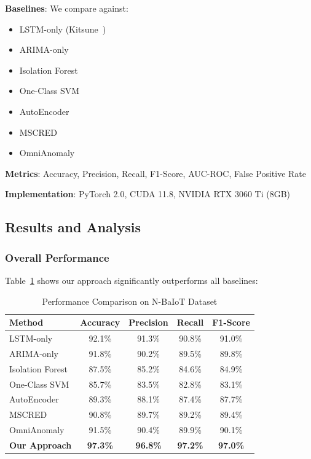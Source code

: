 \documentclass[10pt,conference]{IEEEtran}
\begin{document}
\textbf{Baselines}: We compare against:
\begin{itemize}
    \item LSTM-only (Kitsune~\cite{lstm_ae})
    \item ARIMA-only~\cite{arima_security}
    \item Isolation Forest~\cite{iforest}
    \item One-Class SVM~\cite{ocsvm}
    \item AutoEncoder~\cite{ae_anomaly}
    \item MSCRED~\cite{multiscale_detect}
    \item OmniAnomaly~\cite{anomaly_survey}
\end{itemize}

\textbf{Metrics}: Accuracy, Precision, Recall, F1-Score, AUC-ROC, False Positive Rate

\textbf{Implementation}: PyTorch 2.0, CUDA 11.8, NVIDIA RTX 3060 Ti (8GB)

\subsection{Results and Analysis}

\subsubsection{Overall Performance}

Table~\ref{tab:performance} shows our approach significantly outperforms all baselines:

\begin{table}[!t]
\centering
\caption{Performance Comparison on N-BaIoT Dataset}
\label{tab:performance}
\begin{tabular}{lcccc}
\toprule
\textbf{Method} & \textbf{Accuracy} & \textbf{Precision} & \textbf{Recall} & \textbf{F1-Score} \\
\midrule
LSTM-only & 92.1\% & 91.3\% & 90.8\% & 91.0\% \\
ARIMA-only & 91.8\% & 90.2\% & 89.5\% & 89.8\% \\
Isolation Forest & 87.5\% & 85.2\% & 84.6\% & 84.9\% \\
One-Class SVM & 85.7\% & 83.5\% & 82.8\% & 83.1\% \\
AutoEncoder & 89.3\% & 88.1\% & 87.4\% & 87.7\% \\
MSCRED & 90.8\% & 89.7\% & 89.2\% & 89.4\% \\
OmniAnomaly & 91.5\% & 90.4\% & 89.9\% & 90.1\% \\
\midrule
\textbf{Our Approach} & \textbf{97.3\%} & \textbf{96.8\%} & \textbf{97.2\%} & \textbf{97.0\%} \\
\bottomrule
\end{tabular}
\end{table}
\end{document}

